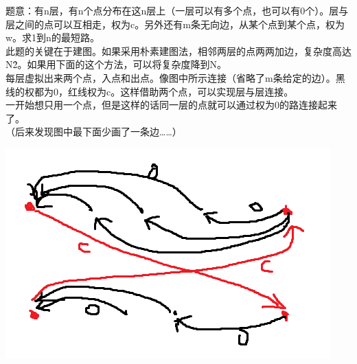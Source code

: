 题意：有n层，有n个点分布在这n层上（一层可以有多个点，也可以有0个）。层与层之间的点可以互相走，权为c。另外还有m条无向边，从某个点到某个点，权为w。求1到n的最短路。 \\
此题的关键在于建图。如果采用朴素建图法，相邻两层的点两两加边，复杂度高达N\^2。如果用下面的这个方法，可以将复杂度降到N。 \\
每层虚拟出来两个点，入点和出点。像图中所示连接（省略了m条给定的边）。黑线的权都为0，红线权为c。这样借助两个点，可以实现层与层连接。 \\
一开始想只用一个点，但是这样的话同一层的点就可以通过权为0的路连接起来了。 \\
（后来发现图中最下面少画了一条边……） \\
\begin{center}
\includegraphics[scale=1]{./模板/13_一些题目/3.jpg}
\end{center}
